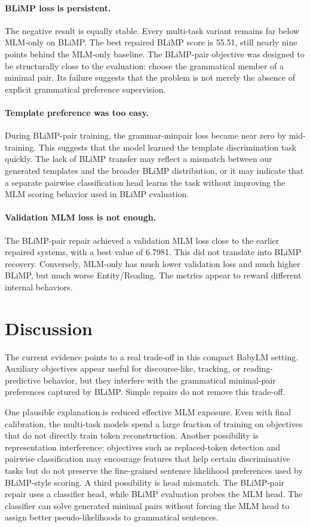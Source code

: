 \documentclass[11pt]{article}
\begin{document}
\paragraph{BLiMP loss is persistent.}
The negative result is equally stable. Every multi-task variant remains far below MLM-only on BLiMP. The best repaired BLiMP score is 55.51, still nearly nine points behind the MLM-only baseline. The BLiMP-pair objective was designed to be structurally close to the evaluation: choose the grammatical member of a minimal pair. Its failure suggests that the problem is not merely the absence of explicit grammatical preference supervision.

\paragraph{Template preference was too easy.}
During BLiMP-pair training, the grammar-minpair loss became near zero by mid-training. This suggests that the model learned the template discrimination task quickly. The lack of BLiMP transfer may reflect a mismatch between our generated templates and the broader BLiMP distribution, or it may indicate that a separate pairwise classification head learns the task without improving the MLM scoring behavior used in BLiMP evaluation.

\paragraph{Validation MLM loss is not enough.}
The BLiMP-pair repair achieved a validation MLM loss close to the earlier repaired systems, with a best value of 6.7981. This did not translate into BLiMP recovery. Conversely, MLM-only has much lower validation loss and much higher BLiMP, but much worse Entity/Reading. The metrics appear to reward different internal behaviors.

\section{Discussion}

The current evidence points to a real trade-off in this compact BabyLM setting. Auxiliary objectives appear useful for discourse-like, tracking, or reading-predictive behavior, but they interfere with the grammatical minimal-pair preferences captured by BLiMP. Simple repairs do not remove this trade-off.

One plausible explanation is reduced effective MLM exposure. Even with final calibration, the multi-task models spend a large fraction of training on objectives that do not directly train token reconstruction. Another possibility is representation interference: objectives such as replaced-token detection and pairwise classification may encourage features that help certain discriminative tasks but do not preserve the fine-grained sentence likelihood preferences used by BLiMP-style scoring. A third possibility is head mismatch. The BLiMP-pair repair uses a classifier head, while BLiMP evaluation probes the MLM head. The classifier can solve generated minimal pairs without forcing the MLM head to assign better pseudo-likelihoods to grammatical sentences.
\end{document}
